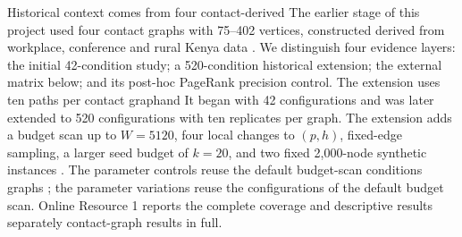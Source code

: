 \documentclass[smallextended]{svjour3}
\providecommand{\DIFaddtex}[1]{{\protect\color{blue} \sf #1}} %
\providecommand{\DIFdeltex}[1]{{\protect\color{red} \scriptsize #1}} %
\providecommand{\DIFaddbegin}{} %
\providecommand{\DIFaddend}{} %
\providecommand{\DIFdelbegin}{} %
\providecommand{\DIFdelend}{} %
\providecommand{\DIFadd}[1]{\texorpdfstring{\DIFaddtex{#1}}{#1}} %
\providecommand{\DIFdel}[1]{\texorpdfstring{\DIFdeltex{#1}}{}} %
\providecommand{\DIFscaledelfig}{0.5}
\newlength{\DIFdelgraphicswidth} %
\newlength{\DIFdelgraphicsheight} %
\providecommand{\DIFaddincludegraphics}[2][]{{\color{blue}\fbox{\DIFOincludegraphics[#1]{#2}}}} %
\providecommand{\DIFdelincludegraphics}[2][]{%
\sbox{\DIFdelgraphicsbox}{\DIFOincludegraphics[#1]{#2}}%
\settoboxwidth{\DIFdelgraphicswidth}{\DIFdelgraphicsbox} %
\settoboxtotalheight{\DIFdelgraphicsheight}{\DIFdelgraphicsbox} %
\scalebox{\DIFscaledelfig}{%
\parbox[b]{\DIFdelgraphicswidth}{\usebox{\DIFdelgraphicsbox}\\[-\baselineskip] \rule{\DIFdelgraphicswidth}{0em}}\llap{\resizebox{\DIFdelgraphicswidth}{\DIFdelgraphicsheight}{%
\setlength{\unitlength}{\DIFdelgraphicswidth}%
\begin{picture}(1,1)%
\thicklines\linethickness{2pt} %
{\color[rgb]{1,0,0}\put(0,0){\framebox(1,1){}}}%
{\color[rgb]{1,0,0}\put(0,0){\line( 1,1){1}}}%
{\color[rgb]{1,0,0}\put(0,1){\line(1,-1){1}}}%
\end{picture}%
}\hspace*{3pt}}} %
} %
\DeclareRobustCommand{\DIFaddbegin}{\DIFOaddbegin \let\includegraphics\DIFaddincludegraphics} %
\DeclareRobustCommand{\DIFaddend}{\DIFOaddend \let\includegraphics\DIFOincludegraphics} %
\DeclareRobustCommand{\DIFdelbegin}{\DIFOdelbegin \let\includegraphics\DIFdelincludegraphics} %
\DeclareRobustCommand{\DIFdelend}{\DIFOaddend \let\includegraphics\DIFOincludegraphics} %
\begin{document}
\DIFdelbegin \DIFdel{Historical context comes from four contact-derived }\DIFdelend \DIFaddbegin \DIFadd{The earlier stage of this project used four contact }\DIFaddend graphs with 75--402 vertices, \DIFdelbegin \DIFdel{constructed }\DIFdelend \DIFaddbegin \DIFadd{derived }\DIFaddend from workplace, conference and rural Kenya data \cite{ref3,ref4,ref5,ref6}. \DIFdelbegin \DIFdel{We distinguish four evidence layers: the initial 42-condition study; a 520-condition historical extension; the external matrix below; and its post-hoc PageRank precision control. The extension uses ten paths per contact graphand }\DIFdelend \DIFaddbegin \DIFadd{It began with 42 configurations and was later extended to 520 configurations with ten replicates per graph. The extension }\DIFaddend adds a budget scan up to $W=5120$, four local changes to $(p,h)$, fixed-edge sampling, a larger seed budget \DIFaddbegin \DIFadd{of $k=20$}\DIFaddend , and two fixed 2,000-node synthetic \DIFdelbegin \DIFdel{instances \cite{ref17,ref18}. The parameter controls reuse the default budget-scan conditions}\DIFdelend \DIFaddbegin \DIFadd{graphs \cite{ref17,ref18}; the parameter variations reuse the configurations of the default budget scan}\DIFaddend . Online Resource 1 reports the \DIFdelbegin \DIFdel{complete coverage and descriptive results separately}\DIFdelend \DIFaddbegin \DIFadd{contact-graph results in full}\DIFaddend .
\end{document}
